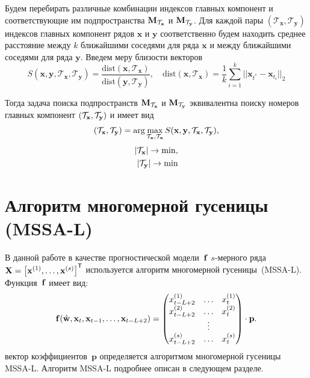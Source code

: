 \documentclass[14pt]{article}
\newcommand{\bM}{\mathbf{M}}
\newcommand{\bx}{\mathbf{x}}
\newcommand{\by}{\mathbf{y}}
\begin{document}
Будем перебирать различные комбинации индексов главных компонент и соответствующие им подпространства $\bM_{\cT_{\bx}}$ и $\bM_{\cT_{\by}}$. Для каждой пары $\left(\mathcal{T}_{\bx}, \mathcal{T}_{\by}\right)$ индексов главных компонент рядов $\bx$ и $\by$ соответственно будем находить среднее расстояние между $k$ ближайшими соседями для ряда $\bx$ и между ближайшими соседями для ряда $\by$. Введем меру близости векторов 
\begin{equation}\label{eq:Sxy}
S(\bx, \by, \mathcal{T}_{\bx}, \mathcal{T}_{\by}) = \dfrac{\text{dist}(\bx, \mathcal{T}_{\bx})}{\text{dist}(\by, \mathcal{T}_{\by})}, \quad 
\text{dist}(\bx, \mathcal{T}_{\bx}) = \frac{1}{k}\sum_{i = 1}^{k}{||\bx_{t^*} - \bx_{t_i}||_2}
\end{equation}

Тогда задача поиска подпространств $\bM_{\cT_{\bx}}$ и $\bM_{\cT_{\by}}$ эквивалентна поиску номеров главных компонент $\left(\cT_{\bx}, \cT_{\by} \right)$ и имеет вид
\begin{equation}\label{eq:argmax}
\begin{aligned}
\left(\cT_{\bx}, \cT_{\by} \right) = \text{arg}\max_{\cT_{\bx}, \cT_{\bx}}S(\bx, \by, \mathcal{T}_{\bx}, \mathcal{T}_{\by}), \\
\end{aligned}
\end{equation}
\vspace{-3mm}
\begin{equation*}
\begin{aligned}
|\cT_{\bx}| \to \min, \\ 
|\cT_{\by}| \to \min 
\end{aligned}
\end{equation*}


\section{Алгоритм многомерной гусеницы (MSSA-L)}
В данной работе в качестве прогностической модели~${\bf f}$ $s$-мерного ряда ${\bf X} = \left[{\bf x}^{(1)}, \ldots ,{\bf x}^{(s)}\right]^{\mathsf{T}}$  используется алгоритм многомерной гусеницы~(MSSA-L). 	Функция~${\bf f}$ имеет вид:
$$ {\bf f}(\hat{\textbf{w}}, {\bf x}_t, {\bf x}_{t-1}, \ldots, {\bf x}_{t - L + 2}) = \begin{pmatrix}
x^{(1)}_{t - L + 2} & \ldots & x^{(1)}_{t} \\
x^{(2)}_{t - L + 2} & \ldots & x^{(2)}_{t} \\ 
&\vdots& \\ 
x^{(s)}_{t - L + 2} & \ldots & x^{(s)}_{t}
\end{pmatrix} \cdot \mathbf{p}.$$
вектор коэффициентов~$\mathbf{p}$ определяется алгоритмом многомерной гусеницы MSSA-L. Алгоритм MSSA-L подробнее описан в следующем разделе.
\end{document}
